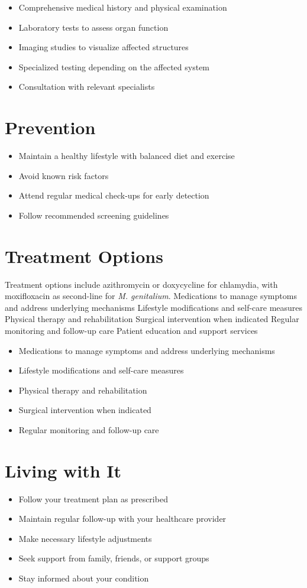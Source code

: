 \begin{itemize}[noitemsep]
  \item Comprehensive medical history and physical examination
  \item Laboratory tests to assess organ function
  \item Imaging studies to visualize affected structures
  \item Specialized testing depending on the affected system
  \item Consultation with relevant specialists
\end{itemize}
\section{Prevention}
\begin{itemize}[noitemsep]
  \item Maintain a healthy lifestyle with balanced diet and exercise
  \item Avoid known risk factors
  \item Attend regular medical check-ups for early detection
  \item Follow recommended screening guidelines
\end{itemize}
\section{Treatment Options}
Treatment options include azithromycin or doxycycline for chlamydia, with moxifloxacin as second-line for \textit{M. genitalium}. Medications to manage symptoms and address underlying mechanisms Lifestyle modifications and self-care measures Physical therapy and rehabilitation Surgical intervention when indicated Regular monitoring and follow-up care Patient education and support services

\begin{itemize}[noitemsep]
  \item Medications to manage symptoms and address underlying mechanisms
  \item Lifestyle modifications and self-care measures
  \item Physical therapy and rehabilitation
  \item Surgical intervention when indicated
  \item Regular monitoring and follow-up care
\end{itemize}
\section{Living with It}
\begin{itemize}[noitemsep]
  \item Follow your treatment plan as prescribed
  \item Maintain regular follow-up with your healthcare provider
  \item Make necessary lifestyle adjustments
  \item Seek support from family, friends, or support groups
  \item Stay informed about your condition
\end{itemize}
